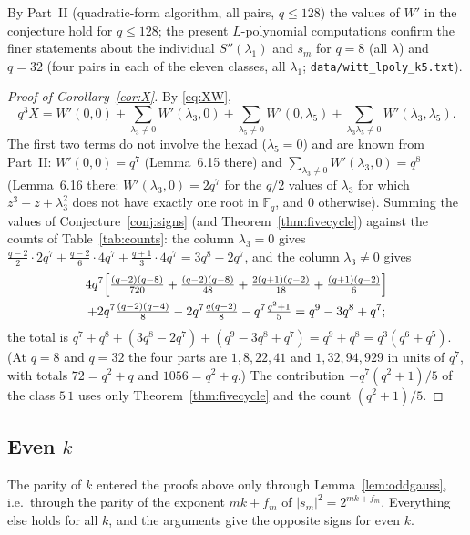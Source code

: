 ﻿\documentclass[12pt,a4paper]{amsart}
\theoremstyle{definition}
\newcommand{\F}{\mathbb{F}}
\newcommand{\Spp}{S''}
\begin{document}
By Part~II (quadratic-form algorithm, all pairs, $q\le128$) the values of $W'$ in the conjecture hold for $q\le128$; the present $L$-polynomial computations confirm the finer statements about the individual $\Spp(\lambda_1)$ and $s_m$ for $q=8$ (all $\lambda$) and $q=32$ (four pairs in each of the eleven classes, all $\lambda_1$; \texttt{data/witt\_lpoly\_k5.txt}).

\begin{proof}[Proof of Corollary~\ref{cor:X}]
By \eqref{eq:XW},
\[
q^3X=W'(0,0)+\sum_{\lambda_3\ne0}W'(\lambda_3,0)+\sum_{\lambda_5\ne0}W'(0,\lambda_5)+\sum_{\lambda_3\lambda_5\ne0}W'(\lambda_3,\lambda_5).
\]
The first two terms do not involve the hexad ($\lambda_5=0$) and are known from Part~II: $W'(0,0)=q^7$ (Lemma~6.15 there) and $\sum_{\lambda_3\ne0}W'(\lambda_3,0)=q^8$ (Lemma~6.16 there: $W'(\lambda_3,0)=2q^7$ for the $q/2$ values of $\lambda_3$ for which $z^3+z+\lambda_3^2$ does not have exactly one root in $\F_q$, and $0$ otherwise). Summing the values of Conjecture~\ref{conj:signs} (and Theorem~\ref{thm:fivecycle}) against the counts of Table~\ref{tab:counts}: the column $\lambda_3=0$ gives $\frac{q-2}2\cdot2q^7+\frac{q-2}6\cdot4q^7+\frac{q+1}3\cdot4q^7=3q^8-2q^7$, and the column $\lambda_3\ne0$ gives
\begin{multline*}
4q^7\Bigl[\tfrac{(q-2)(q-8)}{720}+\tfrac{(q-2)(q-8)}{48}+\tfrac{2(q+1)(q-2)}{18}+\tfrac{(q+1)(q-2)}6\Bigr]\\
+2q^7\tfrac{(q-2)(q-4)}8-2q^7\tfrac{q(q-2)}8-q^7\tfrac{q^2+1}5=q^9-3q^8+q^7 ;
\end{multline*}
the total is $q^7+q^8+(3q^8-2q^7)+(q^9-3q^8+q^7)=q^9+q^8=q^3(q^6+q^5)$. (At $q=8$ and $q=32$ the four parts are $1,8,22,41$ and $1,32,94,929$ in units of $q^7$, with totals $72=q^2+q$ and $1056=q^2+q$.) The contribution $-q^7(q^2+1)/5$ of the class $5\,1$ uses only Theorem~\ref{thm:fivecycle} and the count $(q^2+1)/5$.
\end{proof}

\subsection{Even \texorpdfstring{$k$}{k}}\label{subsec:evenk}
The parity of $k$ entered the proofs above only through Lemma~\ref{lem:oddgauss}, i.e.\ through the parity of the exponent $mk+f_m$ of $|s_m|^2=2^{mk+f_m}$. Everything else holds for all $k$, and the arguments give the opposite signs for even $k$.
\end{document}
